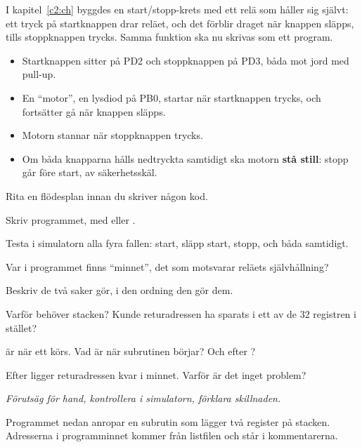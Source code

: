 \label{c10:ex:9}
I kapitel~\ref{c2:ch} byggdes en start/stopp-krets med ett relä som håller sig självt: ett tryck på
startknappen drar reläet, och det förblir draget när knappen släpps, tills stoppknappen trycks.
Samma funktion ska nu skrivas som ett program.
\begin{itemize}
  \item Startknappen sitter på PD2 och stoppknappen på PD3, båda mot jord med pull-up.
  \item En \enquote{motor}, en lysdiod på PB0, startar när startknappen trycks, och fortsätter gå
    när knappen släpps.
  \item Motorn stannar när stoppknappen trycks.
  \item Om båda knapparna hålls nedtryckta samtidigt ska motorn \textbf{stå still}: stopp går före
    start, av säkerhetsskäl.
\end{itemize}
\begin{parts}
  \item Rita en flödesplan innan du skriver någon kod.
  \item Skriv programmet, med  eller .
  \item Testa i simulatorn alla fyra fallen: start, släpp start, stopp, och båda samtidigt.
  \item Var i programmet finns \enquote{minnet}, det som motsvarar reläets självhållning?
\end{parts}

\label{c10:ex:10}
\begin{parts}
  \item Beskriv de två saker  gör, i den ordning den gör dem.
  \item Varför behöver  stacken? Kunde returadressen ha sparats i ett av de 32 registren i
    stället?
  \item {} är  när ett  körs. Vad är  när subrutinen
    börjar? Och efter ?
  \item Efter  ligger returadressen kvar i minnet. Varför är det inget problem?
\end{parts}

\label{c10:ex:11}
\emph{Förutsäg för hand, kontrollera i simulatorn, förklara skillnaden.}

Programmet nedan anropar en subrutin som lägger två register på stacken. Adresserna i
programminnet kommer från listfilen och står i kommentarerna.

